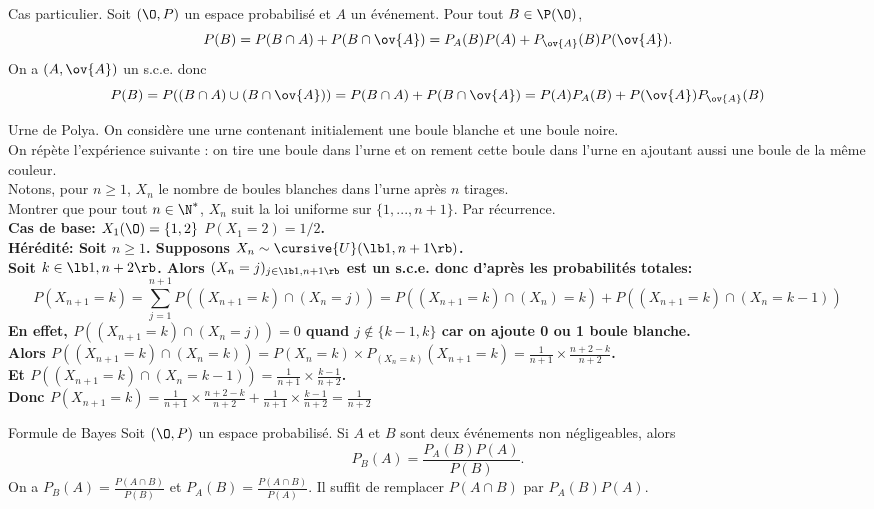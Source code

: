 \documentclass[11pt]{article}
\begin{document}
\begin{corr}{Cas particulier.}{}
    Soit $(\O,P)$ un espace probabilisé et $A$ un événement. Pour tout $B\in\P(\O)$,
    \begin{equation*}
        P(B)=P(B\cap A)+P(B\cap\ov{A})=P_A(B)P(A)+P_{\ov{A}}(B)P(\ov{A}).
    \end{equation*}
    \tcblower
    On a $(A,\ov{A})$ un s.c.e. donc 
    \begin{equation*}P(B)=P((B\cap A)\cup (B\cap\ov{A}))=P(B\cap A)+P(B\cap\ov{A})=P(A)P_A(B)+P(\ov{A})P_{\ov{A}}(B)\end{equation*}
\end{corr}

\begin{ex}{Urne de Polya.}{}
    On considère une urne contenant initialement une boule blanche et une boule noire.\\
    On répète l'expérience suivante : on tire une boule dans l'urne et on rement cette boule dans l'urne en ajoutant aussi une boule de la même couleur.\\
    Notons, pour $n\geq1$, $X_n$ le nombre de boules blanches dans l'urne après $n$ tirages.\\
    Montrer que pour tout $n\in\N^*$, $X_n$ suit la loi uniforme sur $\{1,...,n+1\}$.
    \tcblower
    Par récurrence.\\
    \bf{Cas de base:} $X_1(\O)=\{1,2\}$ $P(X_1=2)=1/2$.\\
    \bf{Hérédité:} Soit $n\geq1$. Supposons $X_n\sim\cursive{U}(\lb1,n+1\rb)$.\\
    Soit $k\in\lb1,n+2\rb$. Alors $(X_n=j)_{j\in\lb1,n+1\rb}$ est un s.c.e. donc d'après les probabilités totales:
    \begin{equation*}
        P(X_{n+1}=k)=\sum_{j=1}^{n+1}P((X_{n+1}=k) \cap (X_n = j))=P((X_{n+1}=k)\cap(X_n)=k) + P((X_{n+1}=k)\cap(X_n=k-1))
    \end{equation*}
    En effet, $P((X_{n+1}=k)\cap(X_n=j))=0$ quand $j\notin\{k-1,k\}$ car on ajoute 0 ou 1 boule blanche.\\
    Alors $P((X_{n+1}=k)\cap(X_n=k))=P(X_n=k)\times P_{(X_n=k)}(X_{n+1}=k)=\frac{1}{n+1}\times\frac{n+2-k}{n+2}$.\\
    Et $P((X_{n+1}=k)\cap(X_n=k-1))=\frac{1}{n+1}\times\frac{k-1}{n+2}$.\\
    Donc $P(X_{n+1}=k)=\frac{1}{n+1}\times\frac{n+2-k}{n+2}+\frac{1}{n+1}\times\frac{k-1}{n+2}=\frac{1}{n+2}$
\end{ex}

\begin{prop}{Formule de Bayes}{}
    Soit $(\O,P)$ un espace probabilisé. Si $A$ et $B$ sont deux événements non négligeables, alors
    \begin{equation*}
        P_B(A)=\frac{P_A(B)P(A)}{P(B)}.
    \end{equation*}
    \tcblower
    On a $P_B(A)=\frac{P(A\cap B)}{P(B)}$ et $P_A(B)=\frac{P(A\cap B)}{P(A)}$. Il suffit de remplacer $P(A\cap B)$ par $P_A(B)P(A)$.
\end{prop}
\end{document}
